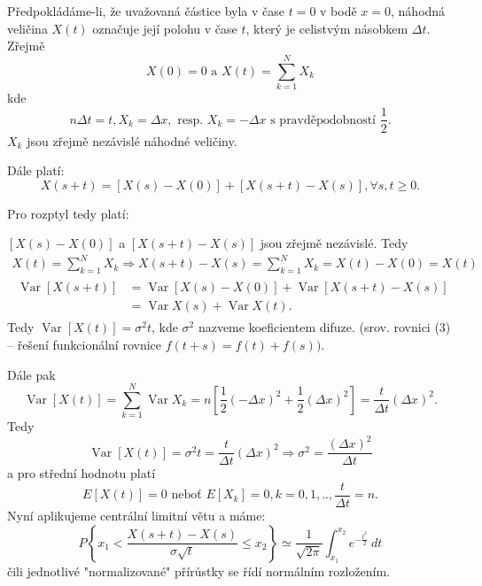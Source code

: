\documentclass[10pt]{article}
\DeclareMathOperator*{\var}{Var}
\begin{document}
Předpokládáme-li, že uvažovaná částice byla v čase $t=0$ v bodě $x=0$, náhodná veličina $X(t)$ označuje její polohu v čase $t$, který je celistvým násobkem $\Delta t$. Zřejmě
\begin{equation}
X(0) = 0 \text{ a } X(t) = \sum_{k=1}^{N} X_k
\end{equation}
kde
\begin{equation}
n \Delta t = t, X_k =  \Delta x, \text{ resp. }X_k =  -\Delta x \text{ s pravděpodobností } \frac{1}{2}.
\end{equation}
$X_k$ jsou zřejmě nezávislé náhodné veličiny.

Dále platí:
\begin{equation}
X(s+t) = \left[X(s)-X(0) \right] + \left[X(s+t)-X(s) \right], \forall s,t \geq 0.
\end{equation}

Pro rozptyl tedy platí:

$\left[X(s)-X(0) \right]$ a $\left[X(s+t)-X(s) \right]$ jsou zřejmě nezávislé. Tedy
\begin{gather}
X(t) = \sum_{k=1}^{N} X_k \Rightarrow X(s+t)-X(s) = \sum_{k=1}^{N} X_k = X(t)-X(0) = X(t)\\
\begin{split}
\var[X(s+t)]	&=\var[X(s)-X(0)] + \var[X(s+t)-X(s)]\\
			&=\var X(s) + \var X(t).
\end{split}
\end{gather}
Tedy $\var[X(t)] = \sigma^2 t$, kde $\sigma^2$ nazveme koeficientem difuze. (srov. rovnici (3) -- řešení funkcionální rovnice $f(t+s)=f(t)+f(s))$.

Dále pak
\begin{equation}
\var[X(t)] = \sum_{k=1}^{N} \var X_k = n \left[\frac{1}{2}(-\Delta x)^2 + \frac{1}{2} (\Delta x)^2 \right] = \frac{t}{\Delta t} (\Delta x)^2.
\end{equation}
Tedy 
\begin{equation}
\var[X(t)] = \sigma^2 t = \frac{t}{\Delta t} (\Delta x)^2 \Rightarrow \sigma^2 = \frac{(\Delta x)^2}{\Delta t}
\end{equation}
a pro střední hodnotu platí
\begin{equation}
E[X(t)]=0 \text{ neboť }E[X_k] = 0, k=0,1,..,\frac{t}{\Delta t} = n.
\end{equation}
Nyní aplikujeme centrální limitní větu a máme:
\begin{equation}
P \left\{ x_1 < \frac{X(s+t)-X(s)}{\sigma \sqrt{t}} \leq x_2 \right\} \simeq \frac{1}{\sqrt{2 \pi}} \int_{x_1}^{x_2} e^{-\frac{t^2}{2}} \ dt
\end{equation}
čili jednotlivé "normalizované" přírůstky se řídí normálním rozložením.
\end{document}

